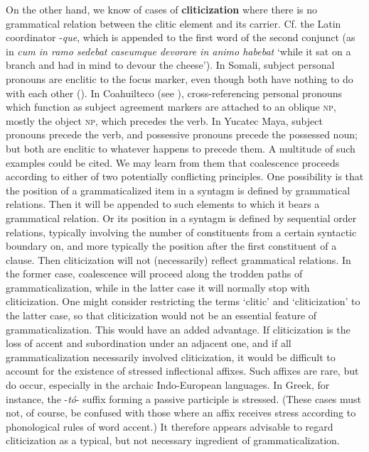 On the other hand, we know of cases of \textbf{cliticization} where there is no grammatical relation between the clitic element and its carrier. Cf. the Latin coordinator -\textit{que}, which is appended to the first word of the second conjunct (as in \textit{cum in ramo sedebat caseumque devorare in animo habebat} ‘while it sat on a branch and had in mind to devour the cheese’). In Somali, subject personal pronouns are enclitic to the focus marker, even though both have nothing to do with each other (). In Coahuilteco (see \citet{Troike1981}), cross-referencing personal pronouns which function as subject agreement markers are attached to an oblique \textsc{np}, mostly the object \textsc{np}, which precedes the verb. In Yucatec Maya, subject pronouns precede the verb, and possessive pronouns precede the possessed noun; but both are enclitic to whatever happens to precede them. A multitude of such examples could be cited. We may learn from them that coalescence proceeds according to either of two potentially conflicting principles. One possibility is that the position of a grammaticalized item in a syntagm is defined by grammatical relations. Then it will be appended to such elements to which it bears a grammatical relation. Or its position in a syntagm is defined by sequential order relations, typically involving the number of constituents from a certain syntactic boundary on, and more typically the position after the first constituent of a clause. Then cliticization will not (necessarily) reflect grammatical relations. In the former case, coalescence will proceed along the trodden paths of grammaticalization, while in the latter case it will normally stop with cliticization. One might consider restricting the terms ‘clitic’ and ‘cliticization’ to the latter case, so that cliticization would not be an essential feature of grammaticalization. This would have an added advantage. If cliticization is the loss of accent and subordination under an adjacent one, and if all grammaticalization necessarily involved cliticization, it would be difficult to account for the existence of stressed inflectional affixes. Such affixes are rare, but do occur, especially in the archaic Indo-European languages. In Greek, for instance, the -\textit{tó}{}- suffix forming a passive participle is stressed. (These cases must not, of course, be confused with those where an affix receives stress according to phonological rules of word accent.) It therefore appears advisable to regard cliticization as a typical, but not necessary ingredient of grammaticalization.

